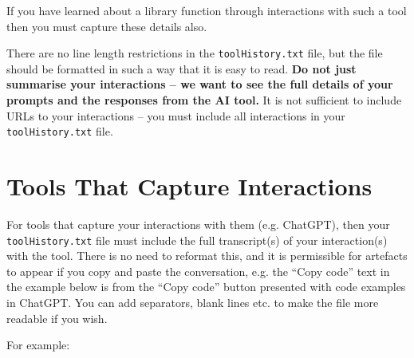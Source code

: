 \documentclass{article}
\begin{document}
If you have learned about a library function through interactions with such a tool then you must capture these details also.

There are no line length restrictions in the \texttt{toolHistory.txt} file,
but the file should be formatted in such a way that it is easy to read. 
\textbf{Do not just summarise your interactions -- we want to see the full details of your prompts and the responses from the AI tool.} It is not sufficient to include URLs to your interactions -- you must include all interactions in your \texttt{toolHistory.txt} file.

\section{Tools That Capture Interactions}

For tools that capture your interactions with them (e.g. ChatGPT), then your \texttt{toolHistory.txt} file must include the full transcript(s) 
of your interaction(s) with the tool. There is no need to reformat this, and it is permissible for artefacts to appear if you copy and 
paste the conversation, e.g. the ``Copy code'' text  in the example below is from the ``Copy code'' button presented with code examples
in ChatGPT. You can add separators, blank lines etc. to make the file more readable if you wish.

For example:
\end{document}

